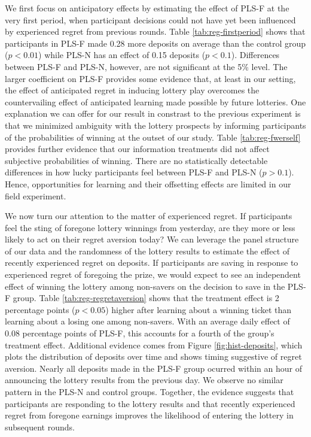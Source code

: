 \documentclass[12pt]{article}
\begin{document}
		

		We first focus on anticipatory effects by estimating the effect of PLS-F at the very first period, when participant decisions could not have yet been influenced by experienced regret from previous rounds. Table \ref{tab:reg-firstperiod} shows that participants in PLS-F made 0.28 more deposits on average than the control group ($p < 0.01$) while PLS-N has an effect of 0.15 deposits ($p < 0.1$). Differences between PLS-F and PLS-N, however, are not significant at the 5\% level. The larger coefficient on PLS-F provides some evidence that, at least in our setting, the effect of anticipated regret in inducing lottery play overcomes the countervailing effect of anticipated learning made possible by future lotteries. One explanation we can offer for our result in constrast to the previous experiment is that we minimized ambiguity with the lottery prospects by informing participants of the probabilities of winning at the outset of our study. Table \ref{tab:reg-fwerself} provides further evidence that our information treatments did not affect subjective probabilities of winning. There are no statistically detectable differences in how lucky participants feel between PLS-F and PLS-N ($p > 0.1$). Hence, opportunities for learning and their offsetting effects are limited in our field experiment.

		

		We now turn our attention to the matter of experienced regret. If participants feel the sting of foregone lottery winnings from yesterday, are they more or less likely to act on their regret aversion today? We can leverage the panel structure of our data and the randomness of the lottery results to estimate the effect of recently experienced regret on deposits. If participants are saving in response to experienced regret of foregoing the prize, we would expect to see an independent effect of winning the lottery among non-savers on the decision to save in the PLS-F group. Table \ref{tab:reg-regretaversion} shows that the treatment effect is 2 percentage points ($p<0.05$) higher after learning about a winning ticket than learning about a losing one among non-savers. With an average daily effect of 0.08 percentage points of PLS-F, this accounts for a fourth of the group's treatment effect. Additional evidence comes from Figure \ref{fig:hist-deposits}, which plots the distribution of deposits over time and shows timing suggestive of regret aversion. Nearly all deposits made in the PLS-F group ocurred within an hour of announcing the lottery results from the previous day. We observe no similar pattern in the PLS-N and control groups. Together, the evidence suggests that participants are responding to the lottery results and that recently experienced regret from foregone earnings improves the likelihood of entering the lottery in subsequent rounds.
\end{document}
